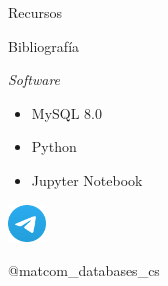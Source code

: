\begin{frame}{Recursos}
   
            \begin{block}{Bibliograf\'ia}
                \nocite{sdb-book}
                \nocite{sql}
                \printbibliography
            \end{block}

            \begin{block}{\textit{Software}}
                \begin{itemize}
                    \item MySQL 8.0
                    \item Python
                    \item Jupyter Notebook
                \end{itemize}
            \end{block}
            
            \centering
            \includegraphics[width=1cm]{img/telegram.png}
            
            @matcom\_databases\_cs
     
      
           
\end{frame}